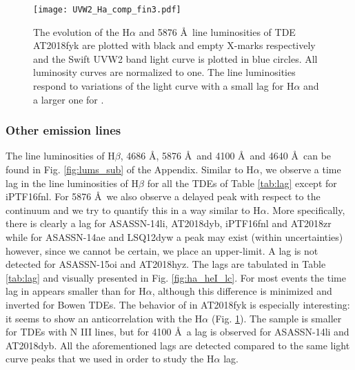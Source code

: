 \documentclass[structabstract]{aa}
\begin{document}
\begin{figure}
\centering
\texttt{[image: UVW2\_Ha\_comp\_fin3.pdf]}
\caption{The evolution of the H$\alpha$ and  5876 \AA\, line luminosities of TDE AT2018fyk are plotted with black and empty X-marks respectively and the Swift UVW2 band light curve \citep{Wevers2019} is plotted in blue circles. All luminosity curves are normalized to one. The line luminosities respond to variations of the light curve with a small lag for H$\alpha$ and a larger one for .}
\label{fig:18fyk_UVW2}
\end{figure}



\subsubsection{Other emission lines} \label{subsub:oel}
The line luminosities of H$\beta$,  4686 \AA,  5876 \AA\, and  4100 \AA\, and 4640 \AA\, can be found in Fig. \ref{fig:lums_sub} of the Appendix. Similar to H$\alpha$, we observe a time lag in the line luminosities of H$\beta$ for all the TDEs of Table \ref{tab:lag} except for iPTF16fnl. For  5876 \AA\, we also observe a delayed peak with respect to the continuum and we try to quantify this in a way similar to H$\alpha$. 
More specifically, there is clearly a lag for ASASSN-14li, AT2018dyb, iPTF16fnl and AT2018zr while for ASASSN-14ae and LSQ12dyw a peak may exist (within uncertainties) however, since we cannot be certain, we place an upper-limit. A lag is not detected for ASASSN-15oi and AT2018hyz. The  lags are tabulated in Table \ref{tab:lag} and visually presented in Fig. \ref{fig:ha_heI_lc}. 
For most events the time lag in  appears smaller than for H$\alpha$, although this difference is minimized and inverted for  Bowen TDEs. 
The behavior of  in AT2018fyk is especially interesting: it seems to show an anticorrelation with the H$\alpha$ (Fig. \ref{fig:18fyk_UVW2}).
The sample is smaller for TDEs with N III lines, but for  4100 \AA\, a lag is observed for ASASSN-14li and AT2018dyb. All the aforementioned lags are detected compared to the same light curve peaks that we used in order to study the H$\alpha$ lag.
\end{document}
